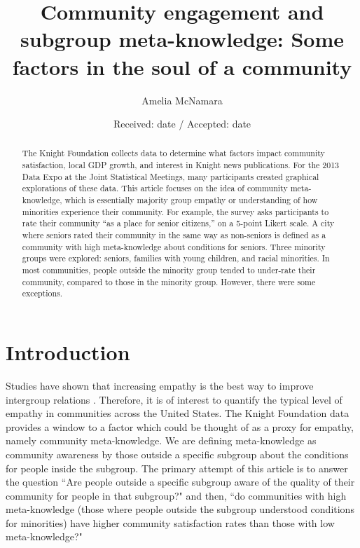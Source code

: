 \documentclass[smallextended]{svjour3}\usepackage[]{graphicx}\usepackage[]{color}
\begin{document}
\title{Community engagement and subgroup meta-knowledge: Some factors in the soul of a community}



\author{Amelia McNamara}

\date{Received: date / Accepted: date}
\maketitle



\begin{abstract} The Knight Foundation collects data to determine what factors impact community satisfaction, local GDP growth, and interest in Knight news publications. For the 2013 Data Expo at the Joint Statistical Meetings, many participants created graphical explorations of these data. This article focuses on the idea of community meta-knowledge, which is essentially majority group empathy or understanding of how minorities experience their community. For example, the survey asks participants to rate their community ``as a place for senior citizens,'' on a 5-point Likert scale. A city where seniors rated their community in the same way as non-seniors is defined as a community with high meta-knowledge about conditions for seniors. Three minority groups were explored: seniors, families with young children, and racial minorities. In most communities, people outside the minority group tended to under-rate their community, compared to those in the minority group. However, there were some exceptions. 
\end{abstract}

\section{Introduction}
\label{intro}
Studies have shown that increasing empathy is the best way to improve intergroup relations \citep{SteFin1999}. Therefore, it is of interest to quantify the typical level of empathy in communities across the United States. The Knight Foundation data provides a window to a factor which could be thought of as a proxy for empathy, namely community meta-knowledge. We are defining meta-knowledge as community awareness by those outside a specific subgroup about the conditions for people inside the subgroup. The primary attempt of this article is to answer the question ``Are people outside a specific subgroup aware of the quality of their community for people in that subgroup?" and then, ``do communities with high meta-knowledge (those where people outside the subgroup understood conditions for minorities) have higher community satisfaction rates than those with low meta-knowledge?"
\end{document}
